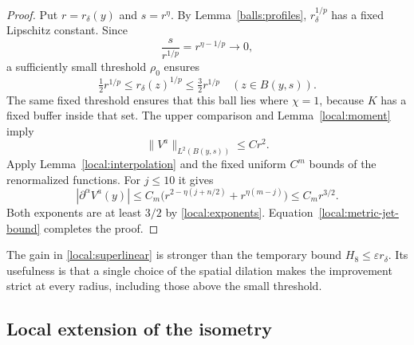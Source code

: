 \begin{proof}
Put $r=r_\delta(y)$ and $s=r^\eta$.  By
Lemma~\ref{balls:profiles}, $r_\delta^{1/p}$ has a fixed Lipschitz
constant.  Since
\[
 \frac{s}{r^{1/p}}=r^{\eta-1/p}\longrightarrow0,
\]
a sufficiently small threshold $\rho_0$ ensures
\[
 \tfrac12 r^{1/p}\leq r_\delta(z)^{1/p}
                         \leq\tfrac32 r^{1/p}
             \quad(z\in B(y,s)).
\]
The same fixed threshold ensures that this ball lies where $\chi=1$,
because $K$ has a fixed buffer inside that set.  The upper comparison
and Lemma~\ref{local:moment} imply
\[
 \|V^a\|_{L^2(B(y,s))}\leq C r^2.
\]
Apply Lemma~\ref{local:interpolation} and the fixed uniform $C^m$
bounds of the renormalized functions.  For $j\leq10$ it gives
\[
 |\partial^\alpha V^a(y)|
   \leq C_m\bigl(r^{2-\eta(j+n/2)}+r^{\eta(m-j)}\bigr)
   \leq C_m r^{3/2}.
\]
Both exponents are at least $3/2$ by \eqref{local:exponents}.
Equation~\eqref{local:metric-jet-bound} completes the proof.
\end{proof}

The gain in \eqref{local:superlinear} is stronger than the temporary
bound $H_8\leq\varepsilon r_\delta$.  Its usefulness is that a single
choice of the spatial dilation makes the improvement strict at every
radius, including those above the small threshold.

\subsection{Local extension of the isometry}

